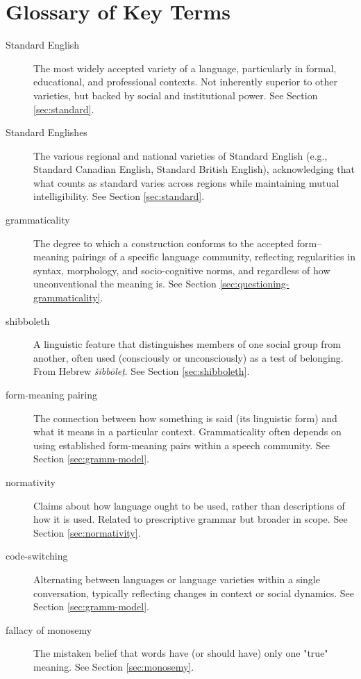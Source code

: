 \section{Glossary of Key Terms}
\begin{description}
    \item[Standard English] The most widely accepted variety of a language, particularly in formal, educational, and professional contexts. Not inherently superior to other varieties, but backed by social and institutional power. See Section \ref{sec:standard}.
    
    \item[Standard Englishes] The various regional and national varieties of Standard English (e.g., Standard Canadian English, Standard British English), acknowledging that what counts as standard varies across regions while maintaining mutual intelligibility. See Section \ref{sec:standard}.
    
    \item[grammaticality] The degree to which a construction conforms to the accepted form--meaning pairings of a specific language community, reflecting regularities in syntax, morphology, and socio-cognitive norms, and regardless of how unconventional the meaning is. See Section \ref{sec:questioning-grammaticality}.
    
    \item[shibboleth] A linguistic feature that distinguishes members of one social group from another, often used (consciously or unconsciously) as a test of belonging. From Hebrew \textit{šibbōleṯ}. See Section \ref{sec:shibboleth}.
    
    \item[form-meaning pairing] The connection between how something is said (its linguistic form) and what it means in a particular context. Grammaticality often depends on using established form-meaning pairs within a speech community. See Section \ref{sec:gramm-model}.
    
    \item[normativity] Claims about how language ought to be used, rather than descriptions of how it is used. Related to prescriptive grammar but broader in scope. See Section \ref{sec:normativity}.
    
    \item[code-switching] Alternating between languages or language varieties within a single conversation, typically reflecting changes in context or social dynamics. See Section \ref{sec:gramm-model}.
    
    \item[fallacy of monosemy] The mistaken belief that words have (or should have) only one "true" meaning. See Section \ref{sec:monosemy}.
\end{description}

